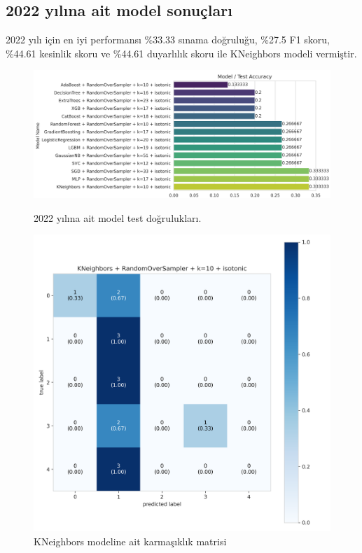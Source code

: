 \newpage

\subsection{2022 yılına ait model sonuçları}
2022 yılı için en iyi performansı \%33.33 sınama doğruluğu,  \%27.5 F1 skoru, \%44.61 kesinlik skoru ve \%44.61 duyarlılık skoru ile KNeighbors modeli vermiştir.

\begin{figure}[ht]
\centering
\begin{minipage}[b]{0.6\textwidth}
    \centering
    \includegraphics[width=\textwidth]{2022.png}
    \caption{2022 yılına ait model test doğrulukları.}
    \label{fig:resim1}
\end{minipage}
\hfill
\begin{minipage}[b]{0.6\textwidth}
    \centering
    \includegraphics[width=\textwidth]{2022_cm.png}
    \caption{KNeighbors modeline ait karmaşıklık matrisi}
    \label{fig:resim2}
\end{minipage}
\end{figure}

